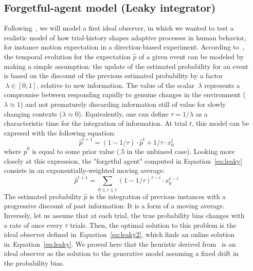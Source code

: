 \documentclass[profile,final,english, draft]{article}%
\newcommand{\choice}[1]{ %
	\left\{ %
		\begin{array}{l} #1 \end{array} %
	\right. }
\newcommand{\eql}[1]{\begin{equation}#1\end{equation}}
\newcommand{\citep}[1]{\parencite{#1}}
\newcommand{\citet}[1]{\textcite{#1}}
\newcommand{\seeEq}[1]{Equation~\ref{eq:#1}}
\begin{document}
\subsection{Forgetful-agent model (Leaky integrator)}
Following~\citep{Maus2015},
we will model a first ideal observer,
in which we wanted to test
a realistic model of how trial-history shapes
adaptive processes in human behavior,
for instance motion expectation in a direction-biased experiment.
According to~\citet{Anderson2006},
the temporal evolution for the expectation $\hat{p}$ of a given event
can be modeled by making a simple assumption:
the update of the estimated probability for an event is based
on the discount of the previous estimated probability
by a factor$~\lambda \in [0, 1]$, relative to new information.
The value of the scalar $~\lambda$ represents
a compromise between responding rapidly
to genuine changes in the environment ($\lambda \approx 1$) and
not prematurely discarding information still of value
for slowly changing contexts  ($\lambda \approx 0$).
Equivalently, one can define $\tau = 1 / \lambda$ as
a characteristic time for the integration of information.
At trial $t$, this model can be expresed with the following equation:
\eql{%
\hat{p}^{t+1} = (1 - 1/\tau) \cdot \hat{p}^{t} + 1/\tau \cdot x_0^t
\label{eq:leaky}}
where $\hat{p}^0$ is equal to some prior value ($.5$ in the unbiased case).
Looking more closely at this expression,
the "forgetful agent" computed in \seeEq{leaky}
consists in an exponentially-weighted moving average:
\eql{
\hat{p}^{t+1} = \sum_{0\leq i \leq t} (1 - 1/\tau)^{t-i} \cdot x_0^{t-i}
\label{eq:leaky2}}
The estimated  probability $\hat{p}$ is the integration of previous instances
with a progressive discount of past information:
It is a form of a moving average.
Inversely, let us assume that at each trial,
the true probability bias changes with a rate of once
every $\tau$ trials.
Then, the optimal solution to this problem is the
ideal observer defined in~\seeEq{leaky2},
which finds an online solution in~\seeEq{leaky}.
We proved here that the heuristic derived from~\citep{Anderson2006}
is an ideal observer as the solution
to the generative model assuming a fixed drift in the probability bias.
\end{document}
